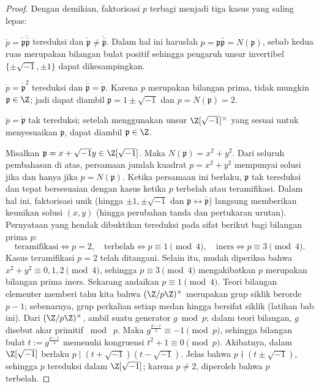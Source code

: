 \begin{proof}
	Dengan demikian, faktorisasi $p$ terbagi menjadi tiga kasus yang saling lepas:
	\begin{compactdesc}
		\item[Terbelah] $\mathring{p} = \mathring{\mathfrak{p}} \mathring{\bar{\mathfrak{p}}}$ tereduksi dan $\mathring{\mathfrak{p}} \neq \mathring{\bar{\mathfrak{p}}}$. Dalam hal ini haruslah $p = \mathfrak{p}\bar{\mathfrak{p}} = N(\mathfrak{p})$, sebab kedua ruas merupakan bilangan bulat positif sehingga pengaruh unsur invertibel $\{\pm\sqrt{-1}, \pm 1\}$ dapat dikesampingkan.
		\item[Teramifikasi] $\mathring{p} = \mathring{\mathfrak{p}}^2$ tereduksi dan $\mathring{\bar{\mathfrak{p}}} = \mathring{\mathfrak{p}}$. Karena $p$ merupakan bilangan prima, tidak mungkin $\mathfrak{p} \in \Z$; jadi dapat diambil $\mathfrak{p} = 1 \pm \sqrt{-1}$ dan $p = N(\mathfrak{p}) = 2$.
		\item[Iners] $\mathring{p} = \mathring{\mathfrak{p}}$ tak tereduksi; setelah menggunakan unsur $\Z[\sqrt{-1}]^\times$ yang sesuai untuk menyesuaikan $\mathfrak{p}$, dapat diambil $\mathfrak{p} \in \Z$.
	\end{compactdesc}
	Misalkan $\mathfrak{p} = x + \sqrt{-1}y \in \Z[\sqrt{-1}]$. Maka $N(\mathfrak{p}) = x^2 + y^2$. Dari seluruh pembahasan di atas, persamaan jumlah kuadrat $p = x^2 + y^2$ mempunyai solusi jika dan hanya jika $p = N(\mathfrak{p})$. Ketika persamaan ini berlaku, $\mathfrak{p}$ tak tereduksi dan tepat bersesuaian dengan kasus ketika $p$ terbelah atau teramifikasi. Dalam hal ini, faktorisasi unik (hingga $\pm 1, \pm\sqrt{-1}$ dan $\mathfrak{p} \leftrightarrow \bar{\mathfrak{p}}$) langsung memberikan keunikan solusi $(x,y)$ (hingga perubahan tanda dan pertukaran urutan). Pernyataan yang hendak dibuktikan tereduksi pada sifat berikut bagi bilangan prima $p$:
	\[ \text{teramifikasi} \iff p=2, \quad \text{terbelah} \iff p \equiv 1 \pmod{4}, \quad \text{iners} \iff p \equiv 3 \pmod{4}. \]
	Kasus teramifikasi $p=2$ telah ditangani. Selain itu, mudah diperiksa bahwa $x^2 + y^2 \equiv 0,1,2 \pmod{4}$, sehingga $p \equiv 3 \pmod{4}$ mengakibatkan $p$ merupakan bilangan prima iners. Sekarang andaikan $p \equiv 1 \pmod{4}$. Teori bilangan elementer memberi tahu kita bahwa $(\Z/p\Z)^\times$ merupakan grup siklik berorde $p-1$; sebenarnya, grup perkalian setiap medan hingga bersifat siklik (latihan bab ini). Dari $(\Z/p\Z)^\times$, ambil suatu generator $g \bmod p$; dalam teori bilangan, $g$ disebut akar primitif $\bmod\; p$. Maka $g^{\frac{p-1}{2}} \equiv -1 \pmod p$, sehingga bilangan bulat $t := g^{\frac{p-1}{4}}$ memenuhi kongruensi $t^2 + 1 \equiv 0 \pmod p$. Akibatnya, dalam $\Z[\sqrt{-1}]$ berlaku $p  \mid  (t + \sqrt{-1})(t - \sqrt{-1})$. Jelas bahwa $p \nmid (t \pm \sqrt{-1})$, sehingga $p$ tereduksi dalam $\Z[\sqrt{-1}]$; karena $p \neq 2$, diperoleh bahwa $p$ terbelah.
\end{proof}

